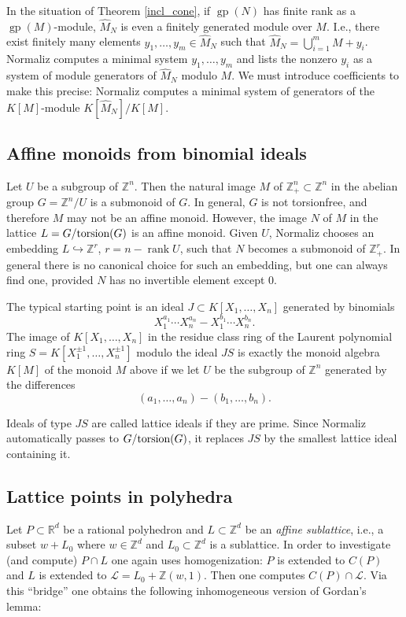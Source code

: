 \documentclass[12pt,a4paper]{scrartcl}
\theoremstyle{definition}
\def\ZZ{{\mathbb Z}}
\def\RR{{\mathbb R}}
\def\cL{{\mathcal L}}
\DeclareMathOperator{\gp}{gp}
\DeclareMathOperator{\rank}{rank}
\begin{document}
In the situation of Theorem \ref{incl_cone}, if $\gp(N)$ has finite rank as a $\gp(M)$-module, $\widehat M_N$ is even a finitely generated module over $M$. I.e., there exist finitely many elements $y_1,\dots,y_m\in \widehat M_N$ such that $\widehat M_N=\bigcup_{i=1}^m M+y_i$. Normaliz computes a minimal system $y_1,\dots,y_m$ and lists the nonzero $y_i$ as a system of module generators of $\widehat M_N$ modulo $M$. We must introduce coefficients to make this precise: Normaliz computes a minimal system of generators of the $K[M]$-module $K[\widehat M_N]/K[M]$.

\subsection{Affine monoids from binomial ideals}\label{binomials}

Let $U$ be a subgroup of $\ZZ^n$. Then the natural image $M$ of
$\ZZ_+^n\subset\ZZ^n$ in the abelian group $G=\ZZ^n/U$ is a
submonoid of $G$. In general, $G$ is not torsionfree, and
therefore $M$ may not be an affine monoid. However, the image
$N$ of $M$ in the lattice $L=G/\textup{torsion}(G)$ is an affine
monoid. Given $U$, Normaliz chooses an embedding
$L\hookrightarrow\ZZ^r$, $r=n-\rank U$, such that $N$ becomes a
submonoid of $\ZZ_+^r$. In general there is no canonical choice
for such an embedding, but one can always find one, provided
$N$ has no invertible element except $0$. 

The typical starting point is an ideal $J\subset
K[X_1,\dots,X_n]$ generated by binomials
$$
X_1^{a_1}\cdots X_n^{a_n}-X_1^{b_1}\cdots X_n^{b_n}.
$$
The image of $K[X_1,\dots,X_n]$ in the residue class ring of
the Laurent polynomial ring $S=K[X_1^{\pm1},\dots,X_n^{\pm1}]$
modulo the ideal $JS$ is exactly the monoid algebra $K[M]$ of
the monoid $M$ above if we let $U$ be the subgroup of $\ZZ^n$
generated by the differences
$$
(a_1,\dots,a_n)-(b_1,\dots,b_n).
$$

Ideals of type $JS$ are called lattice ideals if they are
prime. Since Normaliz automatically passes to
$G/\textup{torsion}(G)$, it replaces $JS$ by the smallest lattice
ideal containing it.

\subsection{Lattice points in polyhedra}\label{latt_hedra}

Let $P\subset \RR^d$ be a rational polyhedron and $L\subset \ZZ^d$ be an \emph{affine sublattice}, i.e., a subset $w+L_0$ where $w\in\ZZ^d$ and $L_0\subset \ZZ^d$ is a sublattice. In order to investigate (and compute) $P\cap L$ one again uses homogenization: $P$ is extended to $C(P)$ and $L$ is extended to $\cL=L_0+\ZZ(w,1)$. Then one computes $C(P)\cap \cL$. Via this ``bridge'' one obtains the following inhomogeneous version of Gordan's lemma:
\end{document}

